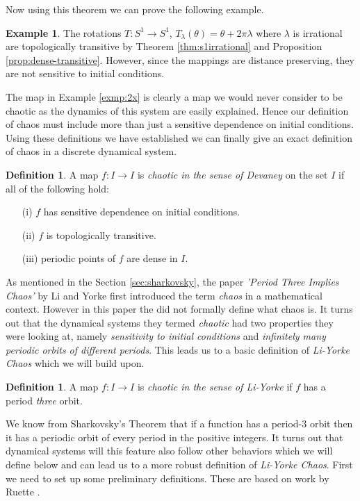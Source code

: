 \documentclass[11pt,a4paper,oneside]{memoir}
\theoremstyle{plain}
\theoremstyle{definition}
\newtheorem{defn}[thm]{Definition}
\newtheorem{exmp}[thm]{Example}
\begin{document}
Now using this theorem we can prove the following example.
\begin{exmp}
    The rotations $T: S^1 \to S^1$, $T_\lambda(\theta) = \theta + 2\pi \lambda$ where $\lambda$ is irrational are topologically transitive by Theorem \ref{thm:s1irrational} and Proposition \ref{prop:dense-transitive}. However, since the mappings are distance preserving, they are not sensitive to initial conditions.
\end{exmp}


The map in Example \ref{exmp:2x} is clearly a map we would never consider to be chaotic as the dynamics of this system are easily explained. Hence our definition of chaos must include more than just a sensitive dependence on initial conditions. Using these definitions we have established we can finally give an exact definition of chaos in a discrete dynamical system.

\begin{defn}
    A map $f: I \to I$ is \emph{chaotic in the sense of Devaney} on the set $I$ if all of the following hold:
    \begin{itemize}
        \item[(i)]$f$ has sensitive dependence on initial conditions.
        \item[(ii)]$f$ is topologically transitive.
        \item[(iii)]periodic points of $f$ are dense in $I$.
    \end{itemize}
\end{defn}

As mentioned in the Section \ref{sec:sharkovsky}, the paper \emph{'Period Three Implies Chaos'} by Li and Yorke \cite{li-yorke} first introduced the term \emph{chaos} in a mathematical context. However in this paper the did not formally define what chaos is. It turns out that the dynamical systems they termed \emph{chaotic} had two properties they were looking at, namely \emph{sensitivity to initial conditions} and \emph{infinitely many periodic orbits of different periods}. This leads us to a basic definition of \emph{Li-Yorke Chaos} which we will build upon.

\begin{defn}
    A map $f: I \to I$ is \emph{chaotic in the sense of Li-Yorke} if $f$ has a period \emph{three} orbit.
\end{defn}

We know from Sharkovsky's Theorem that if a function has a period-3 orbit then it has a periodic orbit of every period in the positive integers. It turns out that dynamical systems will this feature also follow other behaviors which we will define below and can lead us to a more robust definition of \emph{Li-Yorke Chaos}. First we need to set up some preliminary definitions. These are based on work by Ruette \cite[Section 5.1]{ruette}.
\end{document}
